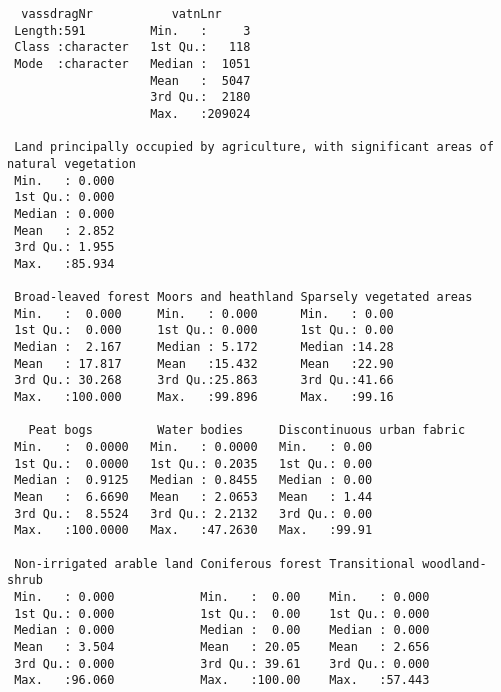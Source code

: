 \documentclass[
]{article}
\begin{document}
\begin{verbatim}
  vassdragNr           vatnLnr      
 Length:591         Min.   :     3  
 Class :character   1st Qu.:   118  
 Mode  :character   Median :  1051  
                    Mean   :  5047  
                    3rd Qu.:  2180  
                    Max.   :209024  
                                    
 Land principally occupied by agriculture, with significant areas of natural vegetation
 Min.   : 0.000                                                                        
 1st Qu.: 0.000                                                                        
 Median : 0.000                                                                        
 Mean   : 2.852                                                                        
 3rd Qu.: 1.955                                                                        
 Max.   :85.934                                                                        
                                                                                       
 Broad-leaved forest Moors and heathland Sparsely vegetated areas
 Min.   :  0.000     Min.   : 0.000      Min.   : 0.00           
 1st Qu.:  0.000     1st Qu.: 0.000      1st Qu.: 0.00           
 Median :  2.167     Median : 5.172      Median :14.28           
 Mean   : 17.817     Mean   :15.432      Mean   :22.90           
 3rd Qu.: 30.268     3rd Qu.:25.863      3rd Qu.:41.66           
 Max.   :100.000     Max.   :99.896      Max.   :99.16           
                                                                 
   Peat bogs         Water bodies     Discontinuous urban fabric
 Min.   :  0.0000   Min.   : 0.0000   Min.   : 0.00             
 1st Qu.:  0.0000   1st Qu.: 0.2035   1st Qu.: 0.00             
 Median :  0.9125   Median : 0.8455   Median : 0.00             
 Mean   :  6.6690   Mean   : 2.0653   Mean   : 1.44             
 3rd Qu.:  8.5524   3rd Qu.: 2.2132   3rd Qu.: 0.00             
 Max.   :100.0000   Max.   :47.2630   Max.   :99.91             
                                                                
 Non-irrigated arable land Coniferous forest Transitional woodland-shrub
 Min.   : 0.000            Min.   :  0.00    Min.   : 0.000             
 1st Qu.: 0.000            1st Qu.:  0.00    1st Qu.: 0.000             
 Median : 0.000            Median :  0.00    Median : 0.000             
 Mean   : 3.504            Mean   : 20.05    Mean   : 2.656             
 3rd Qu.: 0.000            3rd Qu.: 39.61    3rd Qu.: 0.000             
 Max.   :96.060            Max.   :100.00    Max.   :57.443             
                                                                        

\end{verbatim}
\end{document}
